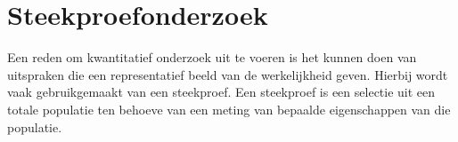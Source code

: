 \chapter{Steekproefonderzoek}
Een reden om kwantitatief onderzoek uit te voeren is het kunnen doen van uitspraken die een representatief beeld van de werkelijkheid geven. Hierbij wordt vaak gebruikgemaakt van een steekproef. Een steekproef is een selectie uit een totale populatie ten behoeve van een meting van bepaalde eigenschappen van die populatie.


\begin{figure}
\centering
\end{figure}
